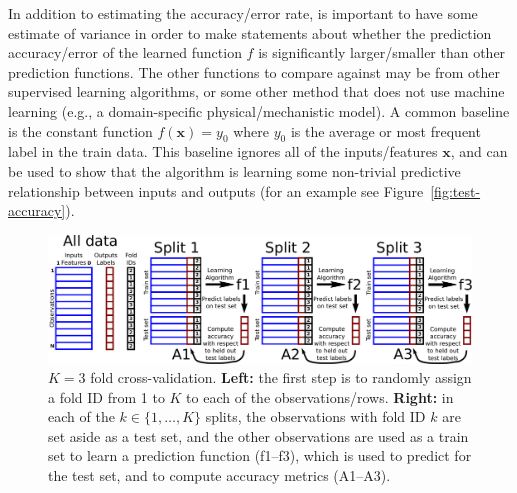 \documentclass[12pt]{article}
\begin{document}
In addition to estimating the accuracy/error rate, is important to
have some estimate of variance in order to make statements about
whether the prediction accuracy/error of the learned function $f$ is
significantly larger/smaller than other prediction functions. The
other functions to compare against may be from other supervised
learning algorithms, or some other method that does not use machine
learning (e.g., a domain-specific physical/mechanistic model). A common
baseline is the constant function $f(\mathbf x) = y_0$ where $y_0$ is
the average or most frequent label in the train data. This baseline
ignores all of the inputs/features $\mathbf x$, and can be used to
show that the algorithm is learning some non-trivial predictive relationship
between inputs and outputs (for an example see
Figure~\ref{fig:test-accuracy}).

\begin{figure}
  \centering
  \includegraphics[width=\textwidth]{drawing-cross-validation}
  \caption{$K=3$ fold cross-validation. \textbf{Left:} the first step
    is to randomly assign a fold ID from 1 to $K$ to each of the
    observations/rows. \textbf{Right:} in each of the
    $k\in\{1, \dots, K\}$ splits, the observations with fold ID $k$
    are set aside as a test set, and the other observations are used
    as a train set to learn a prediction function (f1--f3), which is
    used to predict for the test set, and to compute accuracy metrics
    (A1--A3).}
  \label{fig:cross-validation}
\end{figure}
\end{document}
